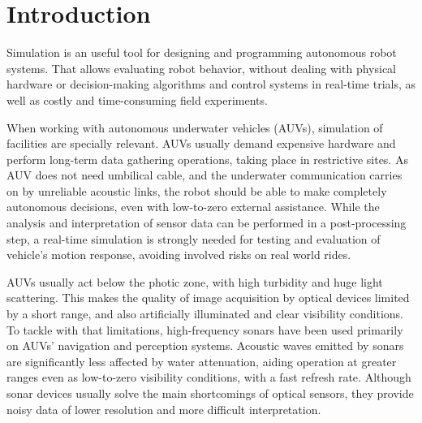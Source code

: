 \documentclass[final,5p,times]{elsarticle}
\begin{document}
\linenumbers

\section{Introduction}
\label{introduction}

Simulation is an useful tool for designing and programming autonomous robot
systems. That allows evaluating robot behavior, without dealing with physical
hardware or decision-making algorithms and control systems in real-time
trials, as well as costly and time-consuming field experiments.

When working with autonomous underwater vehicles (AUVs), simulation of
facilities are specially relevant. AUVs usually demand expensive hardware and
perform long-term data gathering operations, taking place in restrictive
sites. As AUV does not need umbilical cable, and the underwater communication
carries on by unreliable acoustic links, the robot should be able to make
completely autonomous decisions, even with low-to-zero external assistance.
While the analysis and interpretation of sensor data can be performed in a
post-processing step, a real-time simulation is strongly needed for testing
and evaluation of vehicle's motion response, avoiding involved risks on
real world rides.

AUVs usually act below the photic zone, with high turbidity and huge light
scattering. This makes the quality of image acquisition by optical devices
limited by a short range, and also artificially illuminated and clear visibility
conditions. To tackle with that limitations, high-frequency sonars have been used
primarily on AUVs' navigation and perception systems. Acoustic waves emitted
by sonars are significantly less affected by water attenuation,
aiding operation at greater ranges even as low-to-zero visibility conditions,
with a fast refresh rate. Although sonar devices usually solve the main
shortcomings of optical sensors, they provide noisy data of lower resolution
and more difficult interpretation.
\end{document}
